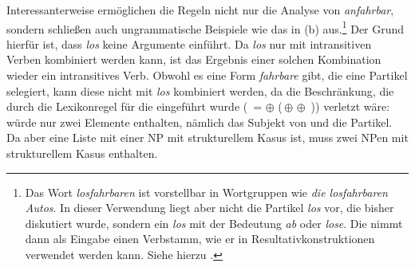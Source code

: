 Interessanterweise ermöglichen die Regeln nicht nur die Analyse von \emph{anfahrbar}, sondern
schließen auch ungrammatische Beispiele wie das in (b) aus.\footnote{
  Das Wort \emph{losfahrbaren} ist vorstellbar in Wortgruppen wie \emph{die losfahrbaren Autos}.
  In dieser Verwendung liegt aber nicht die Partikel \emph{los} vor, die bisher diskutiert
  wurde, sondern ein \emph{los} mit der Bedeutung \emph{ab} oder \emph{lose}. Die \bard
  nimmt dann als Eingabe einen Verbstamm, wie er in
  Resultativkonstruktionen verwendet werden 
  kann. Siehe hierzu .%
}
\eal
{}
\zl
Der Grund hierfür ist, dass \emph{los} keine Argumente einführt. Da \emph{los} nur mit intransitiven
Verben kombiniert werden kann, ist das Ergebnis einer solchen Kombination wieder ein intransitives Verb.
Obwohl es eine Form \emph{fahrbare} gibt, die eine Partikel selegiert, kann diese nicht mit \emph{los}
kombiniert werden, da die Beschränkung, die durch die Lexikonregel für die \bard eingeführt wurde
(\, =  $\oplus$  (\,\etag $\oplus$  $\oplus$ \etag{}\,)) 
verletzt wäre:  würde nur zwei Elemente enthalten, nämlich das Subjekt von  und
die Partikel. Da  aber eine Liste mit einer NP mit strukturellem Kasus ist, muss 
zwei NPen mit strukturellem Kasus enthalten.


